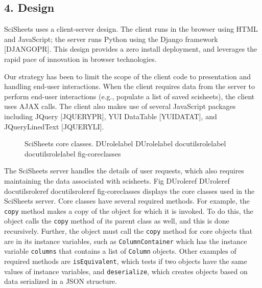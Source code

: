 \documentclass[letterpaper,compsoc,twoside]{IEEEtran}
\providecommand*{\DUrole}[2]{%
  \ifcsname DUrole#1\endcsname%
    \csname DUrole#1\endcsname{#2}%
  \else%
    \ifcsname docutilsrole#1\endcsname%
      \csname docutilsrole#1\endcsname{#2}%
    \else%
      #2%
    \fi%
  \fi%
}
\begin{document}
\subsection{4. Design%
  \label{design}%
}


SciSheets uses a client-server design.
The client runs in the browser using HTML and JavaScript;
the server runs Python using the Django framework {[}DJANGOPR{]}.
This design provides a
zero install deployment, and
leverages the rapid pace of innovation in browser technologies.

Our strategy has been to limit the scope of the client code
to presentation and handling end-user interactions.
When the client requires data from the server
to perform end-user interactions
(e.g., populate a list of saved scisheets),
the client uses AJAX calls.
The client also makes use of several JavaScript packages
including JQuery {[}JQUERYPR{]}, YUI DataTable {[}YUIDATAT{]}, and
JQueryLinedText {[}JQUERYLI{]}.\begin{figure}[]\noindent{}
\caption{SciSheets core classes.
\DUrole{label}{fig-coreclasses}}
\end{figure}

The SciSheets server handles the details of user requests, which also
requires maintaining the data associated with scisheets.
Fig \DUrole{ref}{fig-coreclasses} displays the core
classes used in the SciSheets server.
Core classes have several required methods.
For example, the \texttt{copy} method
makes a copy of the object for which it is
invoked.
To do this, the object calls the \texttt{copy} method of its parent
class as well, and this is done recursively.
Further, the object must call the \texttt{copy} method for core
objects that are in its instance variables,
such as
\texttt{ColumnContainer} which has the instance variable
\texttt{columns} that contains a list of \texttt{Column} objects.
Other examples of required methods are
\texttt{isEquivalent}, which tests if two objects have the same
values of instance variables, and
\texttt{deserialize}, which creates objects based on data serialized
in a JSON structure.
\end{document}
